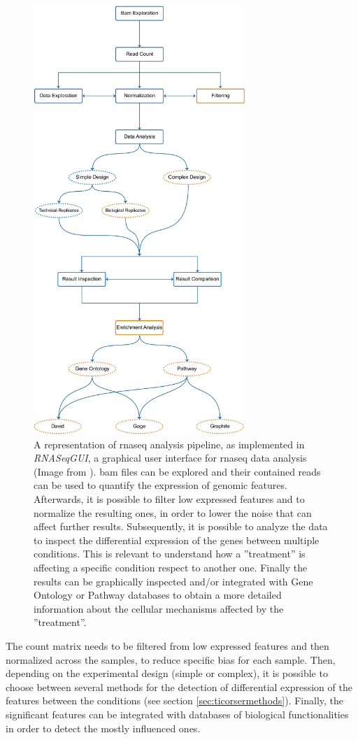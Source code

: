 \begin{figure}[H]
\centering
\includegraphics[width=8cm, keepaspectratio]{img/intro/rnaseqgui1.pdf}
\caption[\gls{rnaseq} pipeline]{A representation of \gls{rnaseq} analysis pipeline, as implemented in \textit{RNASeqGUI}, a graphical user interface for \gls{rnaseq} data analysis (Image from \cite{RussoRighelli2016}).
\gls{bam} files can be explored and their contained reads can be used to quantify the expression of genomic features.
Afterwards, it is possible to filter low expressed features and to normalize the resulting ones, in order to lower the noise that can affect further results.
Subsequently, it is possible to analyze the data to inspect the differential expression of the genes between multiple conditions.
This is relevant to understand how a ''treatment'' is affecting a specific condition respect to another one.
Finally the results can be graphically inspected and/or integrated with Gene Ontology or Pathway databases to obtain a more detailed information about the cellular mechanisms affected by the ''treatment''.}
\label{fig:rnaseqan}
\end{figure}

The count matrix needs to be filtered from low expressed features and then normalized across the samples, to reduce specific bias for each sample.
Then, depending on the experimental design (simple or complex), it is possible to choose between several methods for the detection of differential expression of the features between the conditions (see section \ref{sec:ticorsermethods}).
Finally, the significant features can be integrated with databases of biological functionalities in order to detect the mostly influenced ones.

